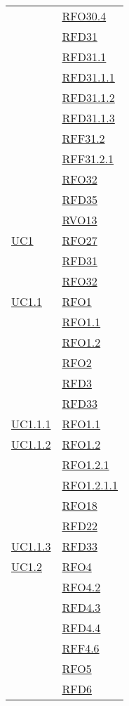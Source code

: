 \begin{longtable}{|>{\centering}m{5cm}|m{5cm}<{\centering}|}
& \hyperlink{RFO30.4}{RFO30.4}\\
& \hyperlink{RFD31}{RFD31}\\
& \hyperlink{RFD31.1}{RFD31.1}\\
& \hyperlink{RFD31.1.1}{RFD31.1.1}\\
& \hyperlink{RFD31.1.2}{RFD31.1.2}\\
& \hyperlink{RFD31.1.3}{RFD31.1.3}\\
& \hyperlink{RFF31.2}{RFF31.2}\\
& \hyperlink{RFF31.2.1}{RFF31.2.1}\\
& \hyperlink{RFO32}{RFO32}\\
& \hyperlink{RFD35}{RFD35}\\
& \hyperlink{RVO13}{RVO13}\\ \hline
\hyperref[UC1]{UC1} & \hyperlink{RFO27}{RFO27}\\
& \hyperlink{RFD31}{RFD31}\\
& \hyperlink{RFO32}{RFO32}\\ \hline
\hyperref[UC1.1]{UC1.1} & \hyperlink{RFO1}{RFO1}\\
& \hyperlink{RFO1.1}{RFO1.1}\\
& \hyperlink{RFO1.2}{RFO1.2}\\
& \hyperlink{RFO2}{RFO2}\\
& \hyperlink{RFD3}{RFD3}\\
& \hyperlink{RFD33}{RFD33}\\ \hline
\hyperref[UC1.1.1]{UC1.1.1} & \hyperlink{RFO1.1}{RFO1.1}\\ \hline
\hyperref[UC1.1.2]{UC1.1.2} & \hyperlink{RFO1.2}{RFO1.2}\\
& \hyperlink{RFO1.2.1}{RFO1.2.1}\\
& \hyperlink{RFO1.2.1.1}{RFO1.2.1.1}\\
& \hyperlink{RFO18}{RFO18}\\
& \hyperlink{RFD22}{RFD22}\\ \hline
\hyperref[UC1.1.3]{UC1.1.3} & \hyperlink{RFD33}{RFD33}\\ \hline
\hyperref[UC1.2]{UC1.2} & \hyperlink{RFO4}{RFO4}\\
& \hyperlink{RFO4.2}{RFO4.2}\\
& \hyperlink{RFD4.3}{RFD4.3}\\
& \hyperlink{RFD4.4}{RFD4.4}\\
& \hyperlink{RFF4.6}{RFF4.6}\\
& \hyperlink{RFO5}{RFO5}\\
& \hyperlink{RFD6}{RFD6}\\

\end{longtable}
